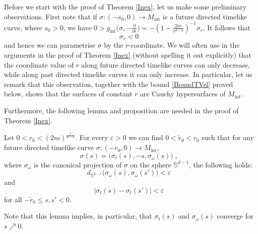 \documentclass[reqno]{article}
\newcommand{\Sd}{\mathbb{S}^{d-1}}
\newcommand{\Mint}{M_{\mathrm{int}}}
\newcommand{\gint}{g_{\mathrm{int}}}
\begin{document}
Before we start with the proof of Theorem \ref{Inex}, let us make some preliminary observations.
First note that if $\sigma : (-s_0, 0) \to \Mint$ is a future directed timelike curve, where $s_0 >0$, we have  $0 > \gint\big(\dot{\sigma}, -\frac{\partial}{\partial r}\big) = -(1 -\frac{2m}{r^{d-2}})^{-1} \dot{\sigma}_r $. It follows that 
\begin{equation}
\label{RVel}
\dot{\sigma}_r <0
\end{equation}
and hence we can parametrise $\sigma$ by the $r$-coordinate. We will often use in the arguments in the proof of Theorem \ref{Inex} (without spelling it out explicitly) that the coordinate value of $r$ along future directed timelike curves can only decrease, while along past directed timelike curves it can only increase. In particular, let us remark that this observation, together with the bound \eqref{BoundTVel} proved below, shows that the surfaces of constant $r$ are Cauchy hypersurfaces of $\Mint$.

Furthermore, the following lemma and proposition are needed in the proof of Theorem \ref{Inex}.

\begin{lemma}\label{schwlem:BoundsOnReach}
\label{BoundsOnReach}
Let $0<r_0< (2m)^{\frac{1}{d-2}}$. For every $\varepsilon >0$ we can find $0<\tilde{r}_0 < r_0 $ such that for any future directed timelike curve $\sigma : (-r_0,0) \to \Mint$,
\begin{equation*}
\sigma(s) = \big(\sigma_t(s), -s, \sigma_{\omega}(s)\big) \;,
\end{equation*}
where $\sigma_{\omega}$ is the canonical projection of $\sigma$ on the sphere $\Sd$, the following holds:
\begin{equation*}
d_{\Sd}\big(\sigma_{\omega}(s), \sigma_{\omega}(s') \big) < \varepsilon     
\end{equation*}
and
\begin{equation*}
|\sigma_t(s) - \sigma_t(s')| < \varepsilon
\end{equation*}
for all  $-\tilde{r}_0 \leq s,s' <0$.
\end{lemma}
Note that this lemma implies, in particular, that $\sigma_t(s)$ and $\sigma_\omega(s)$ converge for $s \nearrow 0$.
\end{document}
